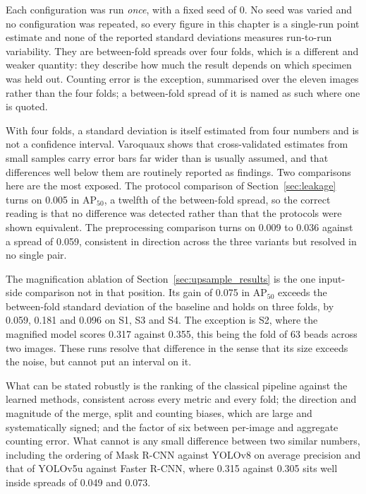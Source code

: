 Each configuration was run \emph{once}, with a fixed seed of 0. No seed was varied
and no configuration was repeated, so every figure in this chapter is a single-run
point estimate and none of the reported standard deviations measures run-to-run
variability. They are between-fold spreads over four folds, which is a different
and weaker quantity: they describe how much the result depends on which specimen
was held out. Counting error is the exception, summarised over the eleven
images rather than the four folds; a between-fold spread of it is named as
such where one is quoted.

With four folds, a standard deviation is itself estimated from four numbers and is
not a confidence interval. Varoquaux \cite{varoquaux2018crossvalidation} shows
that cross-validated estimates from small samples carry error bars far wider than
is usually assumed, and that differences well below them are routinely reported as
findings. Two comparisons here are the most exposed. The protocol comparison of
Section~\ref{sec:leakage} turns on 0.005 in $\mathrm{AP}_{50}$, a twelfth of the
between-fold spread, so the correct reading is that no difference was detected
rather than that the protocols were shown equivalent. The preprocessing comparison
turns on 0.009 to 0.036 against a spread of 0.059, consistent in direction across
the three variants but resolved in no single pair.

The magnification ablation of Section~\ref{sec:upsample_results} is the one
input-side comparison not in that position. Its gain of 0.075 in
$\mathrm{AP}_{50}$ exceeds the between-fold standard deviation of the baseline and
holds on three folds, by 0.059, 0.181 and 0.096 on S1, S3 and S4. The exception is
S2, where the magnified model scores 0.317 against 0.355, this being the fold of
63 beads across two images. These runs resolve that difference in the sense
that its size exceeds the noise, but cannot put an interval on it.

What can be stated robustly is the ranking of the classical pipeline against the
learned methods, consistent across every metric and every fold; the direction and
magnitude of the merge, split and counting biases, which are large and
systematically signed; and the factor of six between per-image and aggregate
counting error. What cannot is any small difference between two similar numbers,
including the ordering of Mask R-CNN against YOLOv8 on average precision and that
of YOLOv5u against Faster R-CNN, where 0.315 against 0.305 sits well inside
spreads of 0.049 and 0.073.
